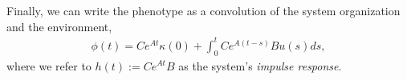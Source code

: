 \documentclass{article}
\newcommand{\ddt}{\dot}
\newcommand{\1}{\mathbbm{1}}
\begin{document}
Finally, we can write the phenotype as a convolution of the system organization and the environment,
  \begin{align}
    \phi(t) = C e^{A t} \kappa(0) + \int_{0}^{t} C e^{A (t-s)} B u(s) ds ,
  \end{align}
where we refer to $h(t) := Ce^{A t}B$ as the system's \emph{impulse response}. 
\end{document}
